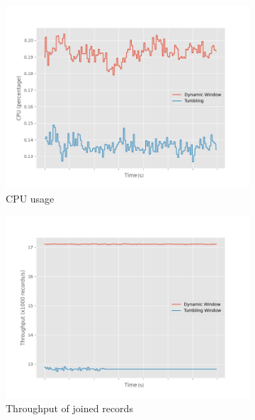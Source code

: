  


\begin{figure}
    \begin{subfigure}[b]{0.5\textwidth}
        \includegraphics[width=\textwidth]{fig/constant-rate/cpu_comparison.png}
        \caption{CPU usage}
        \label{fig:constant_cpu}
    \end{subfigure}
    \hfill 
    \begin{subfigure}[b]{0.5\textwidth}
        \includegraphics[width=\textwidth]{fig/constant-rate/throughput_comparison.png}
        \caption{Throughput of joined records}
        \label{fig:constant_thorughput}
    \end{subfigure}
    \begin{subfigure}[b]{0.5\textwidth}

\end{subfigure}
\end{figure}
